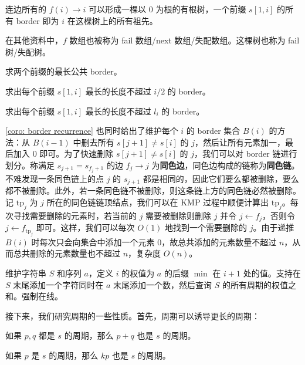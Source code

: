 连边所有的 $f(i)\to i$ 可以形成一棵以 $0$ 为根的有根树，一个前缀 $s[1,i]$ 的所有 border 即为 $i$ 在这棵树上的所有祖先。
\begin{remark}
    在其他资料中，$f$ 数组也被称为 fail 数组/next 数组/失配数组。这棵树也称为 fail 树/失配树。
\end{remark}
\begin{exercise}[P5829]
    求两个前缀的最长公共 border。
\end{exercise}

\begin{exercise}[P2375]
    求出每个前缀 $s[1,i]$ 最长的长度不超过 $i/2$ 的 border。
\end{exercise}
\begin{exercise}
    求出每个前缀 $s[1,i]$ 最长的长度不超过 $l_i$ 的 border。
\end{exercise}

\cref{coro: border recurrence} 也同时给出了维护每个 $i$ 的 border 集合 $B(i)$ 的方法：从 $B(i-1)$ 中删去所有 $s[j+1]\ne s[i]$ 的 $j$，然后让所有元素加一，最后加入 $0$ 即可。为了快速删除 $s[j+1]\ne s[i]$ 的 $j$，我们可以对 border 链进行划分。称满足 $s_{j+1}=s_{f_j+1}$ 的边 $f_j\to j$ 为\textbf{同色边}，同色边构成的链称为\textbf{同色链}。不难发现一条同色链上的点 $j$ 的 $s_{j+1}$ 都是相同的，因此它们要么都被删除，要么都不被删除。此外，若一条同色链不被删除，则这条链上方的同色链必然被删除。记 $\mathrm{tp}_j$ 为 $j$ 所在的同色链链顶结点，我们可以在 KMP 过程中顺便计算出 $\mathrm{tp}_j$。每次寻找需要删除的元素时，若当前的 $j$ 需要被删除则删除 $j$ 并令 $j\gets f_j$，否则令 $j\gets f_{\mathrm{tp}_j}$ 即可。这样，我们可以每次 $O(1)$ 地找到一个需要删除的 $j$。由于递推 $B(i)$ 时每次只会向集合中添加一个元素 $0$，故总共添加的元素数量不超过 $n$，从而总共删除的元素数量也不超过 $n$，复杂度 $O(n)$。
\begin{exercise}[CF1286E]
    维护字符串 $S$ 和序列 $a$，定义 $i$ 的权值为 $a$ 的后缀 $\min$ 在 $i+1$ 处的值。支持在 $S$ 末尾添加一个字符同时在 $a$ 末尾添加一个数，然后查询 $S$ 的所有周期的权值之和。强制在线。
\end{exercise}


接下来，我们研究周期的一些性质。首先，周期可以诱导更长的周期：
\begin{fact}
    如果 $p,q$ 都是 $s$ 的周期，那么 $p+q$ 也是 $s$ 的周期。
\end{fact}
\begin{corollary}
    如果 $p$ 是 $s$ 的周期，那么 $kp$ 也是 $s$ 的周期。
\end{corollary}


